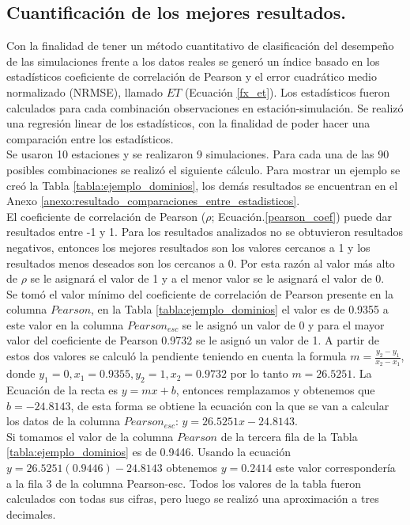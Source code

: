 \subsection{Cuantificación de los mejores resultados.}
Con la finalidad de tener un método cuantitativo de clasificación del desempeño de las simulaciones frente a los datos reales se generó un índice basado en los estadísticos coeficiente de correlación de Pearson y el error cuadrático medio normalizado (NRMSE), llamado $ET$ (Ecuación \ref{fx_et}). Los estadísticos fueron calculados para cada combinación observaciones en estación-simulación. Se realizó una regresión linear de los estadísticos, con la finalidad de poder hacer una comparación entre los estadísticos.\\

Se usaron 10 estaciones y se realizaron 9 simulaciones. Para cada una de las 90 posibles combinaciones se realizó el siguiente cálculo. Para mostrar un ejemplo se creó la Tabla \ref{tabla:ejemplo_dominios}, los demás resultados se encuentran en el Anexo \ref{anexo:resultado_comparaciones_entre_estadisticos}.\\

El coeficiente de correlación de Pearson ($\rho$; Ecuación.\ref{pearson_coef}) puede dar resultados entre -1 y 1. Para los resultados analizados no se obtuvieron resultados negativos, entonces los mejores resultados son los valores cercanos a 1 y los resultados menos deseados son los cercanos a 0. Por esta razón al valor más alto de $\rho$ se le asignará el valor de 1 y a el menor valor se le asignará el valor de 0.\\

Se tomó el valor mínimo del coeficiente de correlación de Pearson presente en la columna $Pearson$, en la Tabla \ref{tabla:ejemplo_dominios} el valor es de 0.9355 a este valor en la columna $Pearson_{esc}$ se le asignó un valor de 0 y para el mayor valor del coeficiente de Pearson 0.9732 se le asignó un valor de 1. A partir de estos dos valores se calculó la pendiente teniendo en cuenta la formula $m = \frac{y_2 - y_1}{x_2 - x_1}$, donde $y_1 = 0, x_1 = 0.9355, y_2 = 1, x_2 = 0.9732$ por lo tanto $m = 26.5251$. La Ecuación de la recta es $y = mx + b$, entonces remplazamos y obtenemos que $b = -24.8143$, de esta forma se obtiene la ecuación con la que se van a calcular los datos de la columna $Pearson_{esc}$: $y = 26.5251x - 24.8143$.\\

Si tomamos el valor de la columna $Pearson$ de la tercera fila de la Tabla \ref{tabla:ejemplo_dominios} es de 0.9446. Usando la ecuación $y = 26.5251 (0.9446) - 24.8143$ obtenemos $y = 0.2414$ este valor correspondería a la fila 3 de la columna Pearson-esc. Todos los valores de la tabla fueron calculados con todas sus cifras, pero luego se realizó una aproximación a tres decimales.\\

